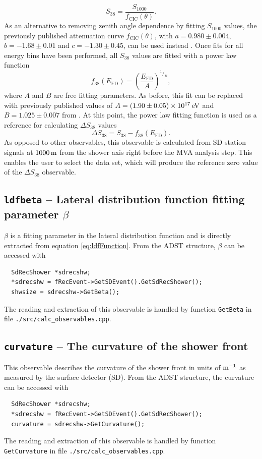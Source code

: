 \documentclass[12pt,a4paper]{report}
\newcommand*\rfrac[2]{{}^{#1}\!/_{#2}}	%
\begin{document}
\begin{equation}\label{eq:s1000tos38}
S_{38} = \frac{S_{1000}}{f_{\textrm{CIC}}(\theta)}.
\end{equation}
As an alternative to removing zenith angle dependence by fitting $S_{1000}$ values, the previously published attenuation curve $f_{\textrm{CIC}}(\theta)$, with $a = 0.980\pm 0.004$, $b = -1.68\pm 0.01$ and $c = -1.30\pm 0.45$, can be used instead \cite{fcicICRC2013}. Once fits for all energy bins have been performed, all $S_{38}$ values are fitted with a power law function
\begin{equation}\label{eq:powerlawfit}
f_{38}(E_{\textrm{FD}}) = \left(\frac{E_{\textrm{FD}}}{A}\right)^{\rfrac{1}{B}},
\end{equation}
where $A$ and $B$ are free fitting parameters. As before, this fit can be replaced with previously published values of $A = \unit[(1.90\pm 0.05)\times 10^{17}]{eV}$ and $B = 1.025\pm 0.007$ from \cite{fcicICRC2013}. At this point, the power law fitting function is used as a reference for calculating $\Delta S_{38}$ values
\begin{equation}
\Delta S_{38} = S_{38} - f_{38}(E_{\textrm{FD}}).
\end{equation}
As opposed to other observables, this observable is calculated from SD station signals at $\unit[1000]{m}$ from the shower axis right before the MVA analysis step. This enables the user to select the data set, which will produce the reference zero value of the $\Delta S_{38}$ observable.

\subsection{\texttt{ldfbeta} -- Lateral distribution function fitting parameter $\beta$}
$\beta$ is a fitting parameter in the lateral distribution function and is directly extracted from equation \eqref{eq:ldfFunction}. From the ADST structure, $\beta$ can be accessed with
\begin{verbatim}
  SdRecShower *sdrecshw;
  *sdrecshw = fRecEvent->GetSDEvent().GetSdRecShower();
  shwsize = sdrecshw->GetBeta();
\end{verbatim}
The reading and extraction of this observable is handled by function \texttt{GetBeta} in file \texttt{./src/calc\_observables.cpp}.

\subsection{\texttt{curvature} -- The curvature of the shower front}
This observable describes the curvature of the shower front in units of $\unit[]{m^{-1}}$ as measured by the surface detector (SD). From the ADST structure, the curvature can be accessed with
\begin{verbatim}
  SdRecShower *sdrecshw;
  *sdrecshw = fRecEvent->GetSDEvent().GetSdRecShower();
  curvature = sdrecshw->GetCurvature();
\end{verbatim}
The reading and extraction of this observable is handled by function \texttt{GetCurvature} in file \texttt{./src/calc\_observables.cpp}.
\end{document}
